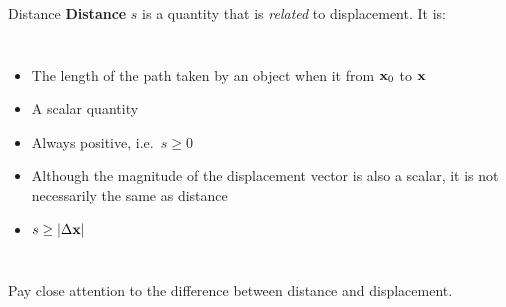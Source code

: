 \documentclass[12pt,compress,aspectratio=169]{beamer}
\newcommand{\mb}[1]{\ensuremath\mathbf{#1}}
\newcommand{\eq}[2]{\vspace{#1}{\Large\begin{displaymath}#2\end{displaymath}}}
\begin{document}
\begin{frame}{Distance}
  \textbf{Distance} $s$ is a quantity that is \emph{related} to displacement.
  It is:
  \begin{columns}
    \begin{itemize}
    \item The length of the path taken by an object when it from $\mb{x}_0$ to
      $\mb{x}$
    \item A scalar quantity
    \item Always positive, i.e.\ $s\geq 0$
    \item Although the magnitude of the displacement vector is also a scalar,
      it is not necessarily the same as distance
    \item $s\geq |\Delta\mb{x}|$
    \end{itemize}
    
  \end{columns}
  \vspace{.15in}Pay close attention to the difference between distance and displacement.
\end{frame}




%
%
%
%  
%  
%
\end{document}
